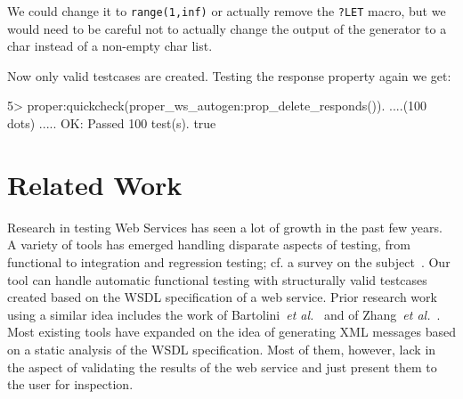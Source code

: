 \documentclass[submission,copyright]{eptcs}
\newcommand{\LET}{\texttt{?LET}\xspace}
\begin{document}
We could change it to \texttt{range(1,inf)} or actually remove the
\LET macro, but we would need to be careful not to actually change the
output of the generator to a char instead of a non-empty char list.

Now only valid testcases are created. Testing the response property again we 
get:
\begin{lstoutput}
5> proper:quickcheck(proper_ws_autogen:prop_delete_responds()).
....(100 dots) .....
OK: Passed 100 test(s).
true
\end{lstoutput}


\section{Related Work} \label{sec:related}

Research in testing Web Services has seen a lot of growth in the past
few years. A variety of tools has emerged handling disparate aspects
of testing, from functional to integration and regression testing; cf.
a survey on the subject~\cite{SOATesting@springerlink-09}. Our tool
can handle automatic functional testing with structurally valid
testcases created based on the WSDL specification of a web service.
Prior research work using a similar idea includes the work of
Bartolini~\textit{et al.}~\cite{bartolini@ICSOC-08} and of
Zhang~\textit{et al.}~\cite{zhang@IC-08}. Most existing tools have
expanded on the idea of generating XML messages based on a static
analysis of the WSDL specification. Most of them, however, lack in the
aspect of validating the results of the web service and just present
them to the user for inspection.
\end{document}
